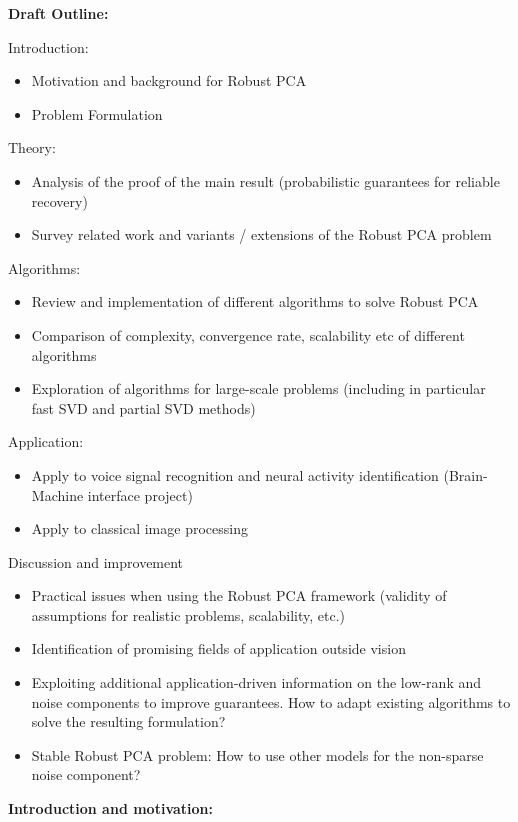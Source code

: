 \documentclass{../../common/projectreport}
\begin{document}
\textbf{Draft Outline:}

Introduction:
\begin{itemize}
\item Motivation and background for Robust PCA 
\item Problem Formulation
\end{itemize}
Theory:
\begin{itemize}
\item Analysis of the proof of the main result (probabilistic guarantees for reliable recovery)
\item Survey related work and variants / extensions of the Robust PCA problem
\end{itemize}
Algorithms:
\begin{itemize}
\item Review and implementation of different algorithms to solve Robust PCA
\item Comparison of complexity, convergence rate, scalability etc of different algorithms
\item Exploration of algorithms for large-scale problems (including in particular fast SVD and partial SVD methods) 
\end{itemize}
Application:
\begin{itemize}
\item Apply to voice signal recognition and neural activity identification (Brain-Machine interface project)
\item Apply to classical image processing
\end{itemize}
Discussion and improvement
\begin{itemize}
\item Practical issues when using the Robust PCA framework (validity of assumptions for realistic problems, scalability, etc.)
\item Identification of promising fields of application outside vision
\item Exploiting additional application-driven information on the low-rank and noise components to improve guarantees. How to adapt existing algorithms to solve the resulting formulation? 
\item Stable Robust PCA problem: How to use other models for the non-sparse noise component?
\end{itemize}

\vspace{5ex}

\textbf{Introduction and motivation:}
\end{document}
